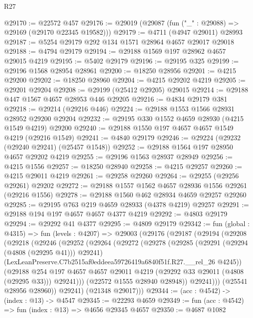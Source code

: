 \begin{lexlean}{R27}
\begin{coremodule}
@29170 := @22572 @457
@29176 := @29019 (@29087 (fun ("_" : @29088) => @29169 (@29170 @22345 @19582)))
@29179 := @4711 (@4947 @29011) @28993
@29187 := @5254 @29179 @292 @134 @1571 @28964 @4657 @29017 @29018
@29188 := @4794 @29179
@29194 := @29188 @1569 @197 @28962 @4657 @29015 @4219
@29195 := @5402 @29179
@29196 := @29195 @325
@29199 := @29196 @1568 @28954 @28961
@29200 := @18250 @28956
@29201 := @4215 @29200
@29202 := @18250 @28960
@29204 := @4215 @29202 @4219
@29205 := @29201 @29204
@29208 := @29199 (@25412 @29205) @29015
@29214 := @29188 @447 @1567 @4657 @28953 @446 @29205
@29216 := @4834 @29179 @381
@29218 := @29214 (@29216 @446)
@29224 := @29188 @1553 @1566 @28931 @28952 @29200 @29204
@29232 := @29195 @330 @1552 @4659 @28930 (@4215 @1549 @4219) @29200
@29240 := @29188 @1550 @197 @4657 @4657 @1549 @4219 (@29216 @1549)
@29241 := @4840 @29179
@29246 := @29224 (@29232 (@29240 @29241) (@25457 @1548))
@29252 := @29188 @1564 @197 @28950 @4657 @29202 @4219
@29255 := @29196 @1563 @28937 @28949
@29256 := @4215 @1556
@29257 := @18250 @28940
@29258 := @4215 @29257
@29260 := @4215 @29011 @4219
@29261 := @29258 @29260
@29264 := @29255 (@29256 @29261) @29202
@29272 := @29188 @1557 @1562 @4657 @28936 @1556 @29261 (@29216 @1556)
@29278 := @29188 @1560 @462 @28934 @4659 @29257 @29260
@29285 := @29195 @763 @219 @4659 @28933 (@4378 @4219) @29257
@29291 := @29188 @194 @197 @4657 @4657 @4377 @4219
@29292 := @4803 @29179
@29294 := @29292 @41 @4377
@29295 := @4809 @29179
@29342 := fun (global : @4315) =>
  fun (levels : @4207) =>
  @29003
    (@29176
      (@29187
        (@29194
          (@29208
            (@29218
              (@29246
                (@29252
                  (@29264
                    (@29272
                      (@29278
                        (@29285
                          (@29291 (@29294 (@4808 (@29295 @41))) @29241)
                          (LexLeanPreserve.C7b2515af0eddeea59726419a6840f51f.R27.__rel_26 @4245))
                        (@29188
                          @254
                          @197
                          @4657
                          @4657
                          @29011
                          @4219
                          (@29292 @33 @29011 (@4808 (@29295 @33)))
                          @29241)))
                    (@22572 @1555 @28940 @28948))
                  @29241)))
            (@25541 @28956 @28960))
          @29241)
        (@21348 @29017)))
@29344 := (acc : @4542) -> (index : @13) -> @4547
@29345 := @22293 @4659
@29349 := fun (acc : @4542) => fun (index : @13) => @4656 @29345 @4657
@29350 := @4687 @1082

\end{coremodule}
\end{lexlean}
